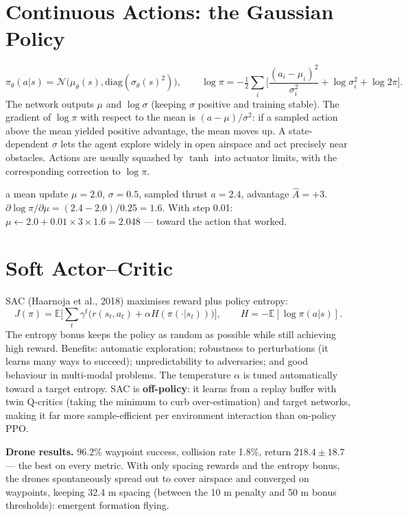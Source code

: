 \documentclass[11pt]{article}
\begin{document}
\section{Continuous Actions: the Gaussian Policy}
\[\pi_\theta(a|s)=\mathcal N\big(\mu_\theta(s),\text{diag}(\sigma_\theta(s)^2)\big),\qquad\log\pi=-\tfrac12\sum_i\Big[\frac{(a_i-\mu_i)^2}{\sigma_i^2}+\log\sigma_i^2+\log2\pi\Big].\]
The network outputs $\mu$ and $\log\sigma$ (keeping $\sigma$ positive and training stable). The gradient of $\log\pi$ with respect to the mean is $(a-\mu)/\sigma^2$: if a sampled action above the mean yielded positive advantage, the mean moves up. A state-dependent $\sigma$ lets the agent explore widely in open airspace and act precisely near obstacles. Actions are usually squashed by $\tanh$ into actuator limits, with the corresponding correction to $\log\pi$.
\begin{example}{a mean update}
$\mu=2.0$, $\sigma=0.5$, sampled thrust $a=2.4$, advantage $\hat A=+3$. $\partial\log\pi/\partial\mu=(2.4-2.0)/0.25=1.6$. With step 0.01: $\mu\leftarrow2.0+0.01\times3\times1.6=2.048$ --- toward the action that worked.
\end{example}

\section{Soft Actor--Critic}
SAC (Haarnoja et al., 2018) maximises reward plus policy entropy:
\[J(\pi)=\mathbb E\Big[\sum_t\gamma^t\big(r(s_t,a_t)+\alpha H(\pi(\cdot|s_t))\big)\Big],\qquad H=-\mathbb E[\log\pi(a|s)].\]
The entropy bonus keeps the policy as random as possible while still achieving high reward. Benefits: automatic exploration; robustness to perturbations (it learns many ways to succeed); unpredictability to adversaries; and good behaviour in multi-modal problems. The temperature $\alpha$ is tuned automatically toward a target entropy. SAC is \textbf{off-policy}: it learns from a replay buffer with twin Q-critics (taking the minimum to curb over-estimation) and target networks, making it far more sample-efficient per environment interaction than on-policy PPO.

\textbf{Drone results.} 96.2\% waypoint success, collision rate 1.8\%, return $218.4\pm18.7$ --- the best on every metric. With only spacing rewards and the entropy bonus, the drones spontaneously spread out to cover airspace and converged on waypoints, keeping 32.4 m spacing (between the 10 m penalty and 50 m bonus thresholds): emergent formation flying.
\end{document}
